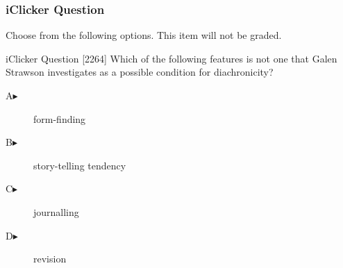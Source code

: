 \begin{frame}
  \frametitle{iClicker Question}
Choose from the following options. This item will not be graded.
\begin{block}{iClicker Question}
[2264] Which of the following features is not one that Galen Strawson
investigates as a possible condition for diachronicity?
\end{block}
\begin{description}
\item[A\hspace{.2in}$\blacktriangleright$] form-finding
\item[B\hspace{.2in}$\blacktriangleright$] story-telling tendency
\item[C\hspace{.2in}$\blacktriangleright$] journalling
\item[D\hspace{.2in}$\blacktriangleright$] revision
\end{description}
\end{frame}
